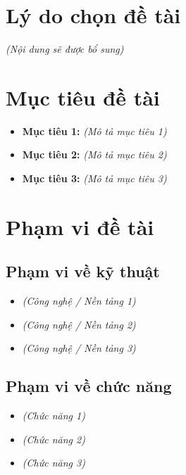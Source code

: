 \section{Lý do chọn đề tài}
\textit{(Nội dung sẽ được bổ sung)}

\section{Mục tiêu đề tài}
\begin{itemize}
    \item \textbf{Mục tiêu 1:} \textit{(Mô tả mục tiêu 1)}
    \item \textbf{Mục tiêu 2:} \textit{(Mô tả mục tiêu 2)}
    \item \textbf{Mục tiêu 3:} \textit{(Mô tả mục tiêu 3)}
\end{itemize}

\section{Phạm vi đề tài}
\subsection{Phạm vi về kỹ thuật}
\begin{itemize}
    \item \textit{(Công nghệ / Nền tảng 1)}
    \item \textit{(Công nghệ / Nền tảng 2)}
    \item \textit{(Công nghệ / Nền tảng 3)}
\end{itemize}

\subsection{Phạm vi về chức năng}
\begin{itemize}
    \item \textit{(Chức năng 1)}
    \item \textit{(Chức năng 2)}
    \item \textit{(Chức năng 3)}
\end{itemize}

